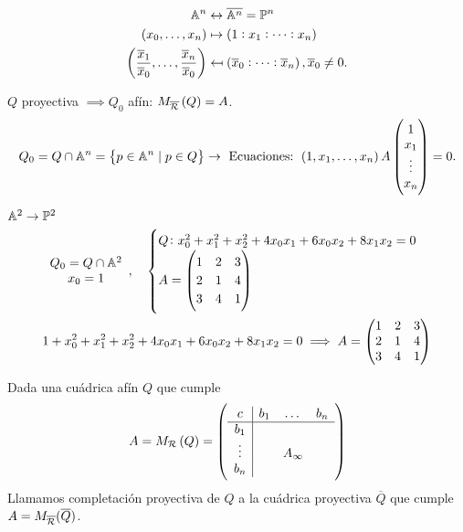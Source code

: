 \begin{align*}
  \mathbb{A}^n &\leftrightarrow \overline{\mathbb{A}^n} = \mathbb{P}^n \\
  \left( x_0, \dots, x_n \right) &\mapsto \left( 1:x_1:\dots:x_n \right) \\
  \left( \frac{\overline{x}_1}{\overline{x}_0}, \dots, \frac{\overline{x}_n}{\overline{x}_0} \right) &\mapsfrom \left( \overline{x}_0:\dots:\overline{x}_n \right), \overline{x}_0 \neq 0.
\end{align*}
\begin{obs}
  $Q$ proyectiva $\implies Q_0$ afín: $M_{\overline{\mathcal{R}}}\left( Q \right) = A$.
  \[ Q_0 = Q\cap \mathbb{A}^n = \left\{ p \in \mathbb{A}^n \;|\; p\in Q \right\} \to \text{ Ecuaciones: } \left( 1,x_1,\dots,x_n \right)A
    \begin{pmatrix}
      1 \\
      x_1 \\
      \vdots \\
      x_n
    \end{pmatrix} = 0.
  \]
\end{obs}
\begin{example}
  $\mathbb{A}^2 \to \mathbb{P}^2$ \\
  \begin{gather*}
    \begin{array}{c}
      Q_0 = Q\cap \mathbb{A}^2 \\
      x_0 = 1
    \end{array}, \quad
    \begin{cases}
      Q \colon x_0^2 + x_1^2 + x_2^2 + 4x_0x_1 + 6x_0x_2 + 8x_1x_2 = 0 \\
      A = 
      \begin{pmatrix}
        1 & 2 & 3 \\
        2 & 1 & 4 \\
        3 & 4 & 1
      \end{pmatrix}
    \end{cases} \\
    1 + x_0^2 + x_1^2 + x_2^2 + 4x_0x_1 + 6x_0x_2 + 8x_1x_2 = 0 \implies A = 
    \begin{pmatrix}
      1 & 2 & 3 \\
      2 & 1 & 4 \\
      3 & 4 & 1
    \end{pmatrix}
  \end{gather*}
\end{example}
\begin{defi}
  Dada una cuádrica afín $Q$ que cumple
  \begin{gather*}
    A = M_{\mathcal{R}}\left( Q \right) =
    \left( \begin{array}{c|ccc}
      c & b_1 & \dots & b_n \\ \hline
      b_1 & & & \\
      \vdots & & A_\infty & \\
      b_n & & & 
    \end{array} \right)
  \end{gather*}
  Llamamos completación proyectiva de $Q$ a la cuádrica proyectiva $\overline{Q}$
  que cumple $A = M_{\overline{\mathcal{R}}}(\overline{Q})$.
  
\end{defi}
